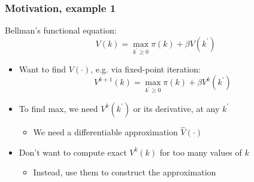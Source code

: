\documentclass[bigger]{beamer}
\begin{document}
\begin{frame}%
\frametitle{Motivation, example 1}

Bellman's functional equation:%
\begin{equation*}
V\left( k\right) =\max_{k^{\prime }\geq 0}\pi \left( k\right) +\beta V\left(
k^{\prime }\right)
\end{equation*}

\begin{itemize}
\item Want to find $V\left( \cdot \right) $, e.g. via fixed-point iteration:%
\begin{equation}
V^{k+1}\left( k\right) =\max_{k^{\prime }\geq 0}\pi \left( k\right) +\beta
V^{k}\left( k^{\prime }\right)  \tag{*}
\end{equation}

\item To find max, we need $V^{k}\left( k^{\prime }\right) $ or its
derivative, at any $k^{\prime }$

\begin{itemize}
\item We need a differentiable approximation $\hat{V}\left( \cdot \right) $
\end{itemize}

\item Don't want to compute exact $V^{k}\left( k\right) $ for too many
values of $k$

\begin{itemize}
\item Instead, use them to construct the approximation
\end{itemize}
\end{itemize}

\end{frame}%
\end{document}
